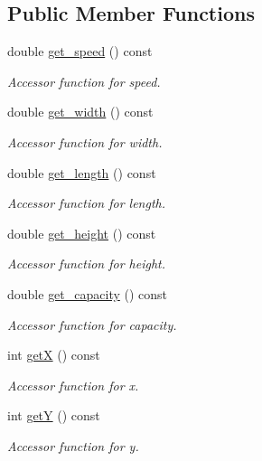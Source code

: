 \subsection*{Public Member Functions}
\begin{DoxyCompactItemize}
\item 
double \hyperlink{classfp_1_1_land_based_robot_a44fed3a00505f6679ff8505aebae4505}{get\+\_\+speed} () const
\begin{DoxyCompactList}\small\item\em Accessor function for speed. \end{DoxyCompactList}\item 
double \hyperlink{classfp_1_1_land_based_robot_a523b439167030a7ab1e0e7f6c8d42315}{get\+\_\+width} () const
\begin{DoxyCompactList}\small\item\em Accessor function for width. \end{DoxyCompactList}\item 
double \hyperlink{classfp_1_1_land_based_robot_adb03fbded9a3b0553301bcc0322cb1c1}{get\+\_\+length} () const
\begin{DoxyCompactList}\small\item\em Accessor function for length. \end{DoxyCompactList}\item 
double \hyperlink{classfp_1_1_land_based_robot_ac77253c989c417ee26654541c50669d4}{get\+\_\+height} () const
\begin{DoxyCompactList}\small\item\em Accessor function for height. \end{DoxyCompactList}\item 
double \hyperlink{classfp_1_1_land_based_robot_a24c0f6d395f3dfd6bdbcf5a2a9801de1}{get\+\_\+capacity} () const
\begin{DoxyCompactList}\small\item\em Accessor function for capacity. \end{DoxyCompactList}\item 
int \hyperlink{classfp_1_1_land_based_robot_aff91a5c22ba358b888fa4939930248ce}{getX} () const
\begin{DoxyCompactList}\small\item\em Accessor function for x. \end{DoxyCompactList}\item 
int \hyperlink{classfp_1_1_land_based_robot_ac2f55928ef37240afda0773e15ad5b17}{getY} () const
\begin{DoxyCompactList}\small\item\em Accessor function for y. \end{DoxyCompactList}\item 

\end{DoxyCompactItemize}
